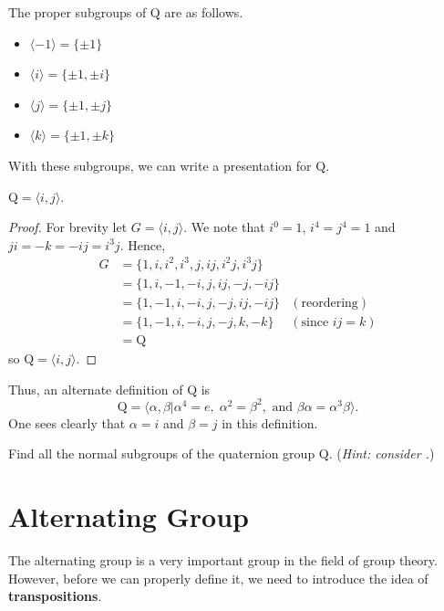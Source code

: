 The proper subgroups of $\mathrm{Q}$ are as follows.
\begin{multicols}{2}
    \begin{itemize}
        \item $\langle -1 \rangle = \{\pm1\}$
        \item $\langle i \rangle = \{\pm1, \pm i\}$
        \item $\langle j \rangle = \{\pm1, \pm j\}$
        \item $\langle k \rangle = \{\pm1, \pm k\}$
    \end{itemize}
\end{multicols}

With these subgroups, we can write a presentation for $\mathrm{Q}$.

\begin{proposition}
    $\mathrm{Q} = \langle i, j \rangle$.
\end{proposition}
\begin{proof}
    For brevity let $G = \langle i, j \rangle$. We note that $i^0 = 1$, $i^4 = j^4 = 1$ and $ji = -k = -ij = i^3j$. Hence,
    \begin{align*}
        G &= \{1, i, i^2, i^3, j, ij, i^2j, i^3j\}\\
        &= \{1, i, -1, -i, j, ij, -j, -ij\}\\
        &= \{1, -1, i, -i, j, -j, ij, -ij\} & (\text{reordering})\\
        &= \{1, -1, i, -i, j, -j, k, -k\} & (\text{since } ij = k)\\
        &= \mathrm{Q}
    \end{align*}
    so $\mathrm{Q} = \langle i, j \rangle$.
\end{proof}

Thus, an alternate definition of $\mathrm{Q}$ is
\[
    \mathrm{Q} = \langle \alpha, \beta \vert \alpha^4 = e,\; \alpha^2 = \beta^2, \text{ and } \beta\alpha = \alpha^3\beta \rangle.
\]
One sees clearly that $\alpha = i$ and $\beta = j$ in this definition.

\begin{exercise}\label{exercise-normal-subgroups-of-quarternion-group}
    Find all the normal subgroups of the quaternion group $\mathrm{Q}$.\newline
    (\textit{Hint: consider .})
\end{exercise}

\section{Alternating Group}
The alternating group is a very important group in the field of group theory. However, before we can properly define it, we need to introduce the idea of \textbf{transpositions}.

